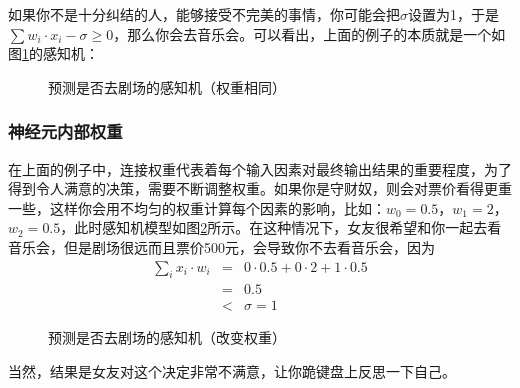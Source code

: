 \parinterval 如果你不是十分纠结的人，能够接受不完美的事情，你可能会把$ \sigma $设置为1，于是$ \sum{w_i\cdot x_i}-\sigma \ge 0 $，那么你会去音乐会。可以看出，上面的例子的本质就是一个如图\ref{fig:5-6}的感知机：

\begin{figure}[htp]
\centering

\caption{预测是否去剧场的感知机（权重相同）}
\label{fig:5-6}
\end{figure}


\vspace{-1em}
\subsubsection{神经元内部权重}

\parinterval 在上面的例子中，连接权重代表着每个输入因素对最终输出结果的重要程度，为了得到令人满意的决策，需要不断调整权重。如果你是守财奴，则会对票价看得更重一些，这样你会用不均匀的权重计算每个因素的影响，比如：$ w_0=0.5 $，$ w_1=2 $，$ w_2=0.5 $，此时感知机模型如图\ref{fig:5-7}所示。在这种情况下，女友很希望和你一起去看音乐会，但是剧场很远而且票价500元，会导致你不去看音乐会，因为
\begin{eqnarray}
\sum_{i}{x_i\cdot w_i} & = & 0\cdot 0.5+0\cdot 2+1\cdot 0.5 \nonumber \\
                                   & = & 0.5 \nonumber \\
                                   & < & \sigma = 1
\label{eq:5-21}
\end{eqnarray}

\begin{figure}[htp]
\centering

\caption{预测是否去剧场的感知机（改变权重）}
\label{fig:5-7}
\end{figure}

\parinterval 当然，结果是女友对这个决定非常不满意，让你跪键盘上反思一下自己。


